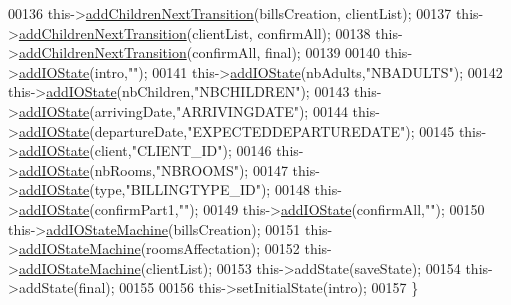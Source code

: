 \begin{DoxyCode}
00136     this->\hyperlink{classSimpleHotel_1_1SH__InOutStateMachine_aaf5afe04d6e4d3d5ebf0b5f1b00eddf1}{addChildrenNextTransition}(billsCreation, clientList);
00137     this->\hyperlink{classSimpleHotel_1_1SH__InOutStateMachine_aaf5afe04d6e4d3d5ebf0b5f1b00eddf1}{addChildrenNextTransition}(clientList, confirmAll);
00138     this->\hyperlink{classSimpleHotel_1_1SH__InOutStateMachine_aaf5afe04d6e4d3d5ebf0b5f1b00eddf1}{addChildrenNextTransition}(confirmAll, \textcolor{keyword}{final});
00139 
00140     this->\hyperlink{classSimpleHotel_1_1SH__InOutStateMachine_a07ae9f1f74a9a41b26e77a014679a33e}{addIOState}(intro,\textcolor{stringliteral}{""});
00141     this->\hyperlink{classSimpleHotel_1_1SH__InOutStateMachine_a07ae9f1f74a9a41b26e77a014679a33e}{addIOState}(nbAdults,\textcolor{stringliteral}{"NBADULTS"});
00142     this->\hyperlink{classSimpleHotel_1_1SH__InOutStateMachine_a07ae9f1f74a9a41b26e77a014679a33e}{addIOState}(nbChildren,\textcolor{stringliteral}{"NBCHILDREN"});
00143     this->\hyperlink{classSimpleHotel_1_1SH__InOutStateMachine_a07ae9f1f74a9a41b26e77a014679a33e}{addIOState}(arrivingDate,\textcolor{stringliteral}{"ARRIVINGDATE"});
00144     this->\hyperlink{classSimpleHotel_1_1SH__InOutStateMachine_a07ae9f1f74a9a41b26e77a014679a33e}{addIOState}(departureDate,\textcolor{stringliteral}{"EXPECTEDDEPARTUREDATE"});
00145     this->\hyperlink{classSimpleHotel_1_1SH__InOutStateMachine_a07ae9f1f74a9a41b26e77a014679a33e}{addIOState}(client,\textcolor{stringliteral}{"CLIENT\_ID"});
00146     this->\hyperlink{classSimpleHotel_1_1SH__InOutStateMachine_a07ae9f1f74a9a41b26e77a014679a33e}{addIOState}(nbRooms,\textcolor{stringliteral}{"NBROOMS"});
00147     this->\hyperlink{classSimpleHotel_1_1SH__InOutStateMachine_a07ae9f1f74a9a41b26e77a014679a33e}{addIOState}(type,\textcolor{stringliteral}{"BILLINGTYPE\_ID"});
00148     this->\hyperlink{classSimpleHotel_1_1SH__InOutStateMachine_a07ae9f1f74a9a41b26e77a014679a33e}{addIOState}(confirmPart1,\textcolor{stringliteral}{""});
00149     this->\hyperlink{classSimpleHotel_1_1SH__InOutStateMachine_a07ae9f1f74a9a41b26e77a014679a33e}{addIOState}(confirmAll,\textcolor{stringliteral}{""});
00150     this->\hyperlink{classSimpleHotel_1_1SH__InOutStateMachine_a27a59a44e0bcddf90d40b38788bb38f4}{addIOStateMachine}(billsCreation);
00151     this->\hyperlink{classSimpleHotel_1_1SH__InOutStateMachine_a27a59a44e0bcddf90d40b38788bb38f4}{addIOStateMachine}(roomsAffectation);
00152     this->\hyperlink{classSimpleHotel_1_1SH__InOutStateMachine_a27a59a44e0bcddf90d40b38788bb38f4}{addIOStateMachine}(clientList);
00153     this->addState(saveState);
00154     this->addState(\textcolor{keyword}{final});
00155 
00156     this->setInitialState(intro);
00157 \}
\end{DoxyCode}



